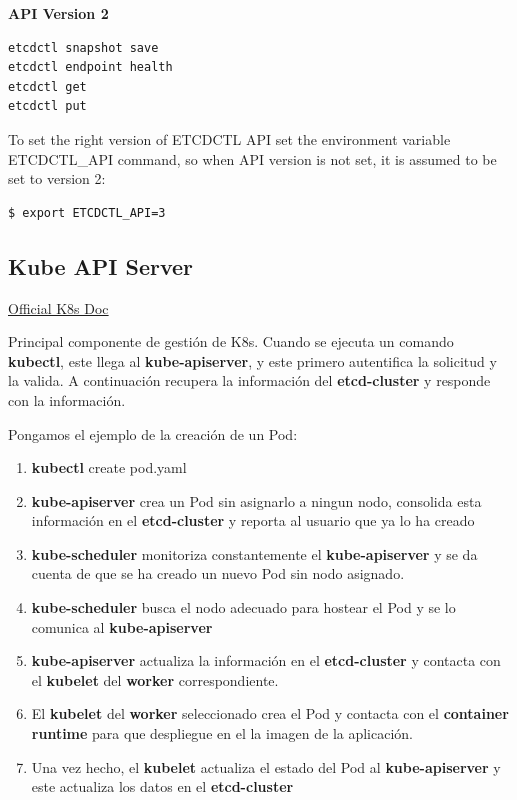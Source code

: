 \documentclass{article}
\newenvironment{codetemplate}[1][]{%
  \mybasecolorbox[#1]
  \itshape
}{%
  \endmybasecolorbox
}
\begin{document}
\textbf{API Version 2}

\begin{codetemplate}{}
\begin{verbatim}
etcdctl snapshot save 
etcdctl endpoint health
etcdctl get
etcdctl put
\end{verbatim}
\end{codetemplate}

To set the right version of ETCDCTL API set the environment variable ETCDCTL\_API command, so when API version is not set, it is assumed to be set to version 2:

\begin{codetemplate}{}
\begin{verbatim}
$ export ETCDCTL_API=3
\end{verbatim}
\end{codetemplate}

\subsection{Kube API Server}

\href{https://kubernetes.io/docs/reference/command-line-tools-reference/kube-apiserver/}{Official K8s Doc}

Principal componente de gestión de K8s. Cuando se ejecuta un comando \textbf{kubectl}, este llega al \textbf{kube-apiserver}, y este primero autentifica la solicitud y la valida. A continuación recupera la información del \textbf{etcd-cluster} y responde con la información.

Pongamos el ejemplo de la creación de un Pod:

\begin{enumerate}
    \item \textbf{kubectl} create pod.yaml
    \item \textbf{kube-apiserver} crea un Pod sin asignarlo a ningun nodo, consolida esta información en el \textbf{etcd-cluster} y reporta al usuario que ya lo ha creado
    \item \textbf{kube-scheduler} monitoriza constantemente el \textbf{kube-apiserver} y se da cuenta de que se ha creado un nuevo Pod sin nodo asignado.
    \item \textbf{kube-scheduler} busca el nodo adecuado para hostear el Pod y se lo comunica al \textbf{kube-apiserver}
    \item \textbf{kube-apiserver} actualiza la información en el \textbf{etcd-cluster} y contacta con el \textbf{kubelet} del \textbf{worker} correspondiente.
    \item El \textbf{kubelet} del \textbf{worker} seleccionado crea el Pod y contacta con el \textbf{container runtime} para que despliegue en el la imagen de la aplicación.
    \item Una vez hecho, el \textbf{kubelet} actualiza el estado del Pod al \textbf{kube-apiserver} y este actualiza los datos en el \textbf{etcd-cluster}
    
\end{enumerate}
\end{document}
